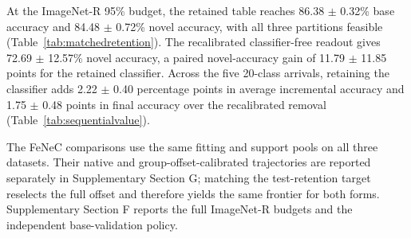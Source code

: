 At the ImageNet-R 95\% budget, the retained table reaches 86.38 $\pm$ 0.32\% base accuracy and 84.48 $\pm$ 0.72\% novel accuracy, with all three partitions feasible (Table~\ref{tab:matchedretention}). The recalibrated classifier-free readout gives 72.69 $\pm$ 12.57\% novel accuracy, a paired novel-accuracy gain of 11.79 $\pm$ 11.85 points for the retained classifier. Across the five 20-class arrivals, retaining the classifier adds 2.22 $\pm$ 0.40 percentage points in average incremental accuracy and 1.75 $\pm$ 0.48 points in final accuracy over the recalibrated removal (Table~\ref{tab:sequentialvalue}).

The FeNeC comparisons use the same fitting and support pools on all three datasets. Their native and group-offset-calibrated trajectories are reported separately in Supplementary Section G; matching the test-retention target reselects the full offset and therefore yields the same frontier for both forms. Supplementary Section F reports the full ImageNet-R budgets and the independent base-validation policy.
